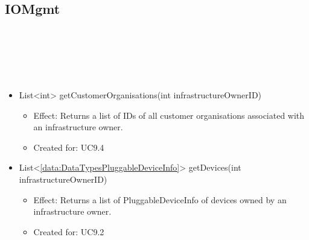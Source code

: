  \subsection{IOMgmt}\label{int:OnlineServiceOnlineServiceInfrastructureOwnerManagerIOMgmt}
    \begin{description}
      \item[Provided by:] \iconcomponent{}~
      \item[Required by:] \iconcomponent{}~
      \item[Operations:] ~
    \begin{itemize}[noitemsep,nolistsep,leftmargin=-.25cm]
      \item \textsf{List\textless{}int\textgreater{} getCustomerOrganisations(int infrastructureOwnerID)}
        \begin{itemize}[noitemsep,nolistsep]
           \item Effect: Returns a list of IDs of all customer organisations associated with an infrastructure owner.
\item Created for: UC9.4
        \end{itemize}
      \item \textsf{List\textless{}\ref{data:DataTypesPluggableDeviceInfo}\textgreater{} getDevices(int infrastructureOwnerID)}
        \begin{itemize}[noitemsep,nolistsep]
           \item Effect: Returns a list of PluggableDeviceInfo of devices owned by an infrastructure owner.
\item Created for: UC9.2
        \end{itemize}
    \end{itemize}
    \end{description}

